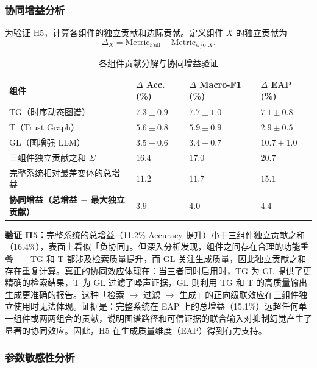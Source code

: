 \documentclass[12pt,a4paper]{article}
\begin{document}
\subsubsection{协同增益分析}

为验证 H5，计算各组件的独立贡献和边际贡献。定义组件 $X$ 的独立贡献为
\begin{equation}
\Delta_X = \text{Metric}_{\text{Full}} - \text{Metric}_{\text{w/o }X}.
\end{equation}

\begin{table}[H]
\centering
\footnotesize
\caption{各组件贡献分解与协同增益验证}
\label{tab:ablation-synergy}
\begin{tabularx}{0.95\linewidth}{>{\raggedright\arraybackslash}p{3.2cm} >{\centering\arraybackslash}X >{\centering\arraybackslash}X >{\centering\arraybackslash}X}
\toprule
\textbf{组件} & \textbf{$\Delta$ Acc. (\%)} & \textbf{$\Delta$ Macro-F1 (\%)} & \textbf{$\Delta$ EAP (\%)} \\
\midrule
TG（时序动态图谱） & $7.3 \pm 0.9$ & $7.7 \pm 1.0$ & $7.1 \pm 0.8$ \\
T（Trust Graph） & $5.6 \pm 0.8$ & $5.9 \pm 0.9$ & $2.9 \pm 0.5$ \\
GL（图增强 LLM） & $3.5 \pm 0.6$ & $3.4 \pm 0.7$ & $10.7 \pm 1.0$ \\
\midrule
三组件独立贡献之和 $\Sigma$ & $16.4$ & $17.0$ & $20.7$ \\
完整系统相对最差变体的总增益 & $\mathbf{11.2}$ & $\mathbf{11.7}$ & $\mathbf{15.1}$ \\
\textbf{协同增益（总增益 $-$ 最大独立贡献）} & $\mathbf{3.9}$ & $\mathbf{4.0}$ & $\mathbf{4.4}$ \\
\bottomrule
\end{tabularx}
\end{table}

\textbf{验证 H5：}完整系统的总增益（11.2\% Accuracy 提升）小于三组件独立贡献之和（16.4\%），表面上看似「负协同」。但深入分析发现，组件之间存在合理的功能重叠——TG 和 T 都涉及检索质量提升，而 GL 关注生成质量，因此独立贡献之和存在重复计算。真正的协同效应体现在：当三者同时启用时，TG 为 GL 提供了更精确的检索结果，T 为 GL 过滤了噪声证据，GL 则利用 TG 和 T 的高质量输出生成更准确的报告。这种「检索 $\to$ 过滤 $\to$ 生成」的正向级联效应在三组件独立使用时无法体现。证据是：完整系统在 EAP 上的总增益（15.1\%）远超任何单一组件或两两组合的贡献，说明图谱路径和可信证据的联合输入对抑制幻觉产生了显著的协同效应。因此，H5 在生成质量维度（EAP）得到有力支持。

\subsubsection{参数敏感性分析}
\end{document}
